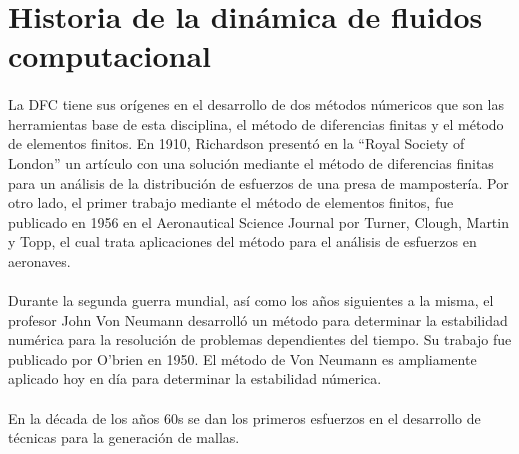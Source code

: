 \documentclass[letterpaper, openright, 12pt]{book}
\begin{document}
        \section{Historia de la dinámica de fluidos computacional}
            \paragraph*{}
                La DFC tiene sus orígenes en el desarrollo de dos métodos
                númericos que son las herramientas base de esta disciplina,
                el método de diferencias finitas y el método de elementos
                finitos. En 1910, Richardson presentó en la ``Royal Society of
                London'' un artículo con una solución mediante el método de
                diferencias finitas para un análisis de la distribución de
                esfuerzos de una presa de mampostería. Por otro lado, el primer
                trabajo mediante el método de elementos finitos, fue publicado
                en 1956 en el Aeronautical Science Journal por Turner, Clough,
                Martin y Topp, el cual trata aplicaciones del método para el
                análisis de esfuerzos en aeronaves.\cite{tj-chung}

            \paragraph*{}
                Durante la segunda guerra mundial, así como los años siguientes
                a la misma, el profesor John Von Neumann desarrolló un método
                para determinar la estabilidad numérica para la resolución de
                problemas dependientes del tiempo. Su trabajo fue publicado por
                O'brien en 1950. El método de Von Neumann es ampliamente
                aplicado hoy en día para determinar la estabilidad númerica.\cite{pletcher-CFD-HeatTransfer}

            \paragraph*{}
                En la década de los años 60s se dan los primeros esfuerzos en el
                desarrollo de técnicas para la generación de mallas.\cite{liseikin1999grid}
\end{document}
